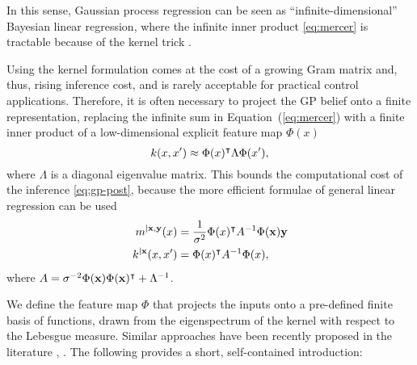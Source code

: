 In this sense, Gaussian process regression can be seen as
``infinite-dimensional'' Bayesian linear regression, where the infinite inner
product \eqref{eq:mercer} is tractable because of the kernel trick
\cite[]{Scholkopf.Smola:2002:Learning}.

Using the kernel formulation comes at the cost of a growing Gram matrix and,
thus, rising inference cost, and is rarely acceptable for practical control
applications. Therefore, it is often necessary to project the GP belief onto a
finite representation, replacing the infinite sum in Equation~(\ref{eq:mercer})
with a finite inner product of a low-dimensional explicit feature map $\Phi(x)$
\begin{equation}
  k(x,x') \approx \Phi(x)^{\intercal}\Lambda\Phi(x'),
\end{equation}
where $\Lambda$ is a diagonal eigenvalue matrix.
This bounds the computational cost of the inference \eqref{eq:gp-post},
because the more efficient formulae of general linear regression can be used
\begin{subequations}
\label{eq:featue-post}
\begin{align}
  m^{|\mathbf{x},\mathbf{y}}(x) &= \frac{1}{\sigma^2}\Phi(x)^{\intercal}
A^{-1}\Phi(\mathbf{x})
\mathbf{y}\\
  k^{|\mathbf{x}}(x,x') &= \Phi(x)^{\intercal} A^{-1}\Phi(x),
\end{align}
\end{subequations}
where $A=\sigma^{-2}\Phi(\mathbf{x})\Phi(\mathbf{x})^{\intercal} +\Lambda^{-1}$.

We define the feature map $\Phi$ that projects the inputs onto a pre-defined
finite basis of functions, drawn from the eigenspectrum of the kernel with
respect to the Lebesgue measure. Similar approaches have been recently proposed
in the literature \cite{Lazaro.ea:2010:Sparse}, \cite{Rahimi.Recht:2008:Random}.
The following provides a short, self-contained introduction:

